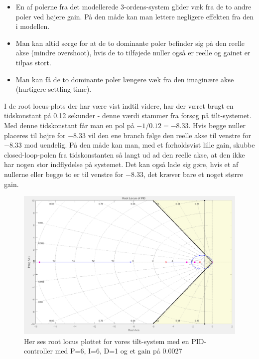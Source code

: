 \begin{itemize}
	\item 	En af polerne fra det modellerede 3-ordens-system glider væk fra de to andre poler ved højere gain. På den måde kan man lettere negligere effekten fra den i modellen.
	\item  	Man kan altid sørge for at de to dominante poler befinder sig på den 				   	reelle akse (mindre overshoot), hvis de to tilføjede nuller også er reelle og gainet er tilpas stort. 
	\item  	Man kan få de to dominante poler længere væk fra den imaginære akse 					(hurtigere settling time).
\end{itemize}

I de root locus-plots der har være vist indtil videre, har der været brugt en tidskonstant på 0.12 sekunder - denne værdi stammer fra forsøg på tilt-systemet. Med denne tidskonstant får man en pol på $-1/0.12=-8.33$. Hvis begge nuller placeres til højre for $-8.33$ vil den ene branch følge den reelle akse til venstre for $-8.33$ mod uendelig. På den måde kan man, med et forholdsvist lille gain, skubbe closed-loop-polen fra tidskonstanten så langt ud ad den reelle akse, at den ikke har nogen stor indflydelse på systemet. Det kan også lade sig gøre, hvis et af nullerne eller begge to er til venstre for $-8.33$, det kræver bare et noget større gain.

\begin{figure}[ht]
	\begin{center}
		\includegraphics[scale=0.45]{Billeder/PID_rlocus.PNG}
	\end{center}
\caption{Her ses root locus plottet for vores tilt-system med en PID-controller med P=6, I=6, D=1 og et gain på 0.0027}
\label{fig:PID_rlocus}
\end{figure}


